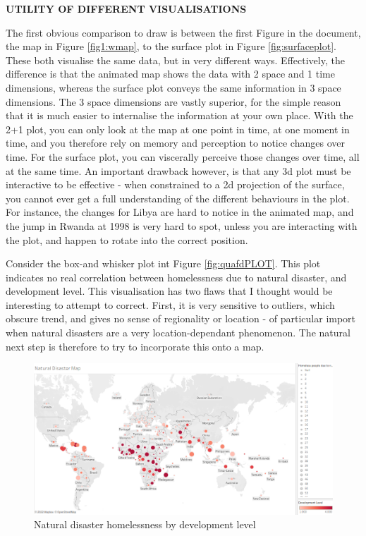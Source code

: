 \documentclass[ 10pt ]{fphw}
\begin{document}
\vspace{0.8cm}

\textbf{UTILITY OF DIFFERENT VISUALISATIONS} 

\vspace{0.8cm}

The first obvious comparison to draw is between the first Figure in the document, the map in Figure \ref{fig1:wmap}, to the surface plot in Figure \ref{fig:surfaceplot}. These both visualise the same data, but in very different ways. Effectively, the difference is that the animated map shows the data with 2 space and 1 time dimensions, whereas the surface plot conveys the same information in 3 space dimensions. The 3 space dimensions are vastly superior, for the simple reason that it is much easier to internalise the information at your own place. With the 2+1 plot, you can only look at the map at one point in time, at one moment in time, and you therefore rely on memory and perception to notice changes over time. For the surface plot, you can viscerally perceive those changes over time, all at the same time. An important drawback however, is that any 3d plot must be interactive to be effective - when constrained to a 2d projection of the surface, you cannot ever get a full understanding of the different behaviours in the plot. For instance, the changes for Libya are hard to notice in the animated map, and the jump in Rwanda at 1998 is very hard to spot, unless you are interacting with the plot, and happen to rotate into the correct position.


Consider the box-and whisker plot int Figure \ref{fig:quafdPLOT}. This plot indicates no real correlation between homelessness due to natural disaster, and development level. This visualisation has two flaws that I thought would be interesting to attempt to correct. First, it is very sensitive to outliers, which obscure trend, and gives no sense of regionality or location - of particular import when natural disasters are a very location-dependant phenomenon. The natural next step is therefore to try to incorporate this onto a map. 

\begin{center}
\begin{figure}[H]
    \centering
	\includegraphics[width=0.75\columnwidth]{natDISMAP.png} 
	\caption{Natural disaster homelessness by development level}
	\label{fig:disastermap}
	\end{figure}
\end{center}
\end{document}
